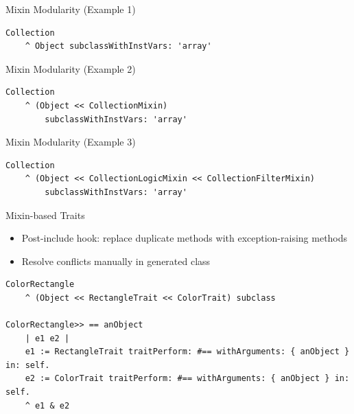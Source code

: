 \documentclass[xcolor=dvipsname, handout]{beamer} %
\begin{document}
\begin{frame}[fragile]{Mixin Modularity (Example 1)}
\begin{lstlisting}
Collection
    ^ Object subclassWithInstVars: 'array'
\end{lstlisting}
\end{frame}

\begin{frame}[fragile]{Mixin Modularity (Example 2)}
\begin{lstlisting}
Collection
    ^ (Object << CollectionMixin)
        subclassWithInstVars: 'array'
\end{lstlisting}
\end{frame}

\begin{frame}[fragile]{Mixin Modularity (Example 3)}
\begin{lstlisting}
Collection
    ^ (Object << CollectionLogicMixin << CollectionFilterMixin)
        subclassWithInstVars: 'array'
\end{lstlisting}
\end{frame}

\begin{frame}[fragile]{Mixin-based Traits}
\begin{itemize}
  \item Post-include hook: replace duplicate methods with exception-raising methods
  \item Resolve conflicts manually in generated class
\end{itemize}
\begin{lstlisting}
ColorRectangle
    ^ (Object << RectangleTrait << ColorTrait) subclass

ColorRectangle>> == anObject
    | e1 e2 |
    e1 := RectangleTrait traitPerform: #== withArguments: { anObject } in: self.
    e2 := ColorTrait traitPerform: #== withArguments: { anObject } in: self.
    ^ e1 & e2
\end{lstlisting}
\end{frame}

\end{document}
